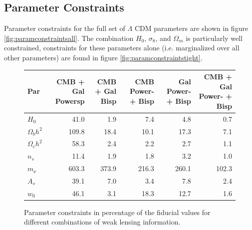 \documentclass[11pt]{article} %
\begin{document}
\subsection{Parameter Constraints}
Parameter constraints for the full set of $\Lambda$ CDM parameters are shown in figure \ref{fig:paramconstraintsall}. The combination $H_0$, $\sigma_8$, and $\Omega_m$ is particularly well constrained, constraints for these parameters alone (i.e. marginalized over all other parameters) are found in figure \ref{fig:paramconstraintstight}. 



\begin{figure}
    \centering
    \tiny
    \begin{tabular}{lrrrrr}
        \hline
         Par            &   CMB + Gal Powersp &   CMB + Gal Bisp &   CMB Power- + Bisp &   Gal Power- + Bisp &   CMB + Gal Power- + Bisp \\
        \hline
         $H_0$          &                41.0 &              1.9 &                 7.4 &                 4.8 &                       0.7 \\
         $\Omega_b h^2$ &               109.8 &             18.4 &                10.1 &                17.3 &                       7.1 \\
         $\Omega_c h^2$ &                58.3 &              2.4 &                 2.2 &                 2.7 &                       1.1 \\
         $n_s$          &                11.4 &              1.9 &                 1.8 &                 3.2 &                       1.0 \\
         $m_\nu$        &               603.3 &            373.9 &               216.3 &               260.1 &                     102.3 \\
         $A_s$          &                39.1 &              7.0 &                 3.4 &                 7.8 &                       2.4 \\
         $w_0$          &                46.1 &              3.1 &                18.3 &                12.7 &                       1.6 \\
        \hline
    \end{tabular}
\caption{Parameter constraints in percentage of the fiducial values for different combinations of weak lensing information.}
\label{tab:paramconstraintsall}
\end{figure}
\end{document}
